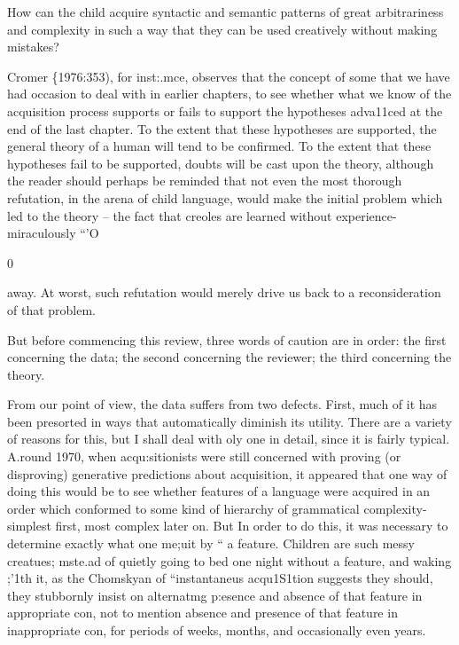 How can the child acquire syntactic and semantic patterns of great arbitrariness and complexity in such a way that they can be used creatively without making mistakes?

Cromer \{1976:353), for inst:.mce, observes that the concept of
some that we have had occasion to deal with in earlier chapters, to see whether what we know of the acquisition process supports or fails to support the hypotheses adva11ced at the end of the last chapter. To the extent that these hypotheses are supported, the general theory of a human  will tend to be confirmed. To the
extent that these hypotheses fail to be supported, doubts will be cast upon the theory, although the reader should perhaps be reminded that not even the most thorough refutation, in the arena of child language, would make the initial problem which led to the theory --
the fact that creoles are learned without experience-miraculously ``'O

0

away. At worst, such refutation would merely drive us back to a
reconsideration of that problem.


But before commencing this review, three words of caution are in order: the first concerning the data; the second concerning the reviewer; the third concerning the theory.

From our point of view, the data suffers from two defects. First,
much of it has been presorted in ways that automatically diminish its utility. There are a variety of reasons for this, but I shall deal with oly one in detail, since it is fairly typical. A.round 1970, when acqu:si\-tionists were still concerned with proving (or disproving) generative predictions about acquisition, it appeared that one way of doing this would be to see whether features of a language were acquired in an order which conformed to some kind of hierarchy of grammatical complexity-simplest first, most complex later on. But In order to do this, it was necessary to determine exactly what one me;uit by `` a feature. Children are such messy creatues; mste.ad of quietly going to bed one night without a feature, and waking ;'1th it, as the Chomskyan  of ``instantaneus acqu1S1tion suggests they should, they stubbornly insist on alternatmg p:esence and absence of that feature in appropriate con, not to mention absence and presence of that feature in inappropriate con, for periods of weeks, months, and occasionally even years.

